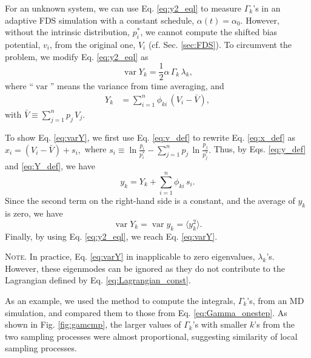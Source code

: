 \documentclass[reprint, floatfix]{revtex4-1}
\newcommand{\note}[1]{{\color{DarkGreen}\footnotesize \textsc{Note.} #1}}
\begin{document}
%
For an unknown system,
we can use Eq. \eqref{eq:y2_eql} to
measure $\Gamma_k$'s in
an adaptive FDS simulation
with a constant schedule,
$\alpha(t) = \alpha_0$.
%
However,
without the intrinsic distribution, $p^*_i$,
we cannot compute the shifted bias potential, $v_i$,
from the original one, $V_i$
(cf. Sec. \ref{sec:FDS}).
%
To circumvent the problem, we
modify Eq. \eqref{eq:y2_eql} as
%
\begin{equation}
  \operatorname{var} Y_k
  =
  \frac{1}{2}
  \alpha \, \Gamma_k \, \lambda_k,
\label{eq:varY}
\end{equation}
%
where
``$\operatorname{var}$''
means the variance from time averaging,
and
%
\begin{align}
Y_k
&=
\sum_{ i = 1 }^n
  \phi_{k i} \, (V_i - \bar V),
\label{eq:Y_def}
\end{align}
%
with
$
\bar V
\equiv
\sum_{ j = 1 }^n p_j \, V_j.
$

To show Eq. \eqref{eq:varY},
we first use Eq. \eqref{eq:v_def}
to rewrite Eq. \eqref{eq:x_def}
as
$
  x_i
  =
  (V_i - \bar V) + s_i,
$
where
$
  s_i
  \equiv
  \ln \frac{ p_i } { p^*_i }
  -
  \sum_{ j = 1 }^n
    p_j \, \ln \frac{ p_j } { p^*_j }.
$
Thus, by Eqs. \eqref{eq:y_def} and \eqref{eq:Y_def},
we have
$$
y_k = Y_k + \sum_{i = 1}^n \phi_{k i} \, s_i.
$$
Since the second term on the right-hand side
is a constant, and the average of $y_k$ is zero,
we have
$$
\operatorname{var} Y_k
=
\operatorname{var} y_k
=
\langle y_k^2 \rangle.
$$
Finally, by using Eq. \eqref{eq:y2_eql},
we reach Eq. \eqref{eq:varY}.

\note{In practice, Eq. \eqref{eq:varY}
in inapplicable to zero eigenvalues, $\lambda_k$'s.
%
However, these eigenmodes can be ignored
as they do not contribute to the Lagrangian defined by
Eq. \eqref{eq:Lagrangian_const}.
}


As an example, we used the method to compute
the integrals, $\Gamma_k$'s, from an MD simulation,
and compared them to those from
Eq. \eqref{eq:Gamma_onestep}.
%
As shown in Fig. \ref{fig:gamcmp},
the larger values of $\Gamma_k$'s
with smaller $k$'s
from the two sampling processes
were almost proportional,
suggesting similarity
of local sampling processes.
\end{document}
